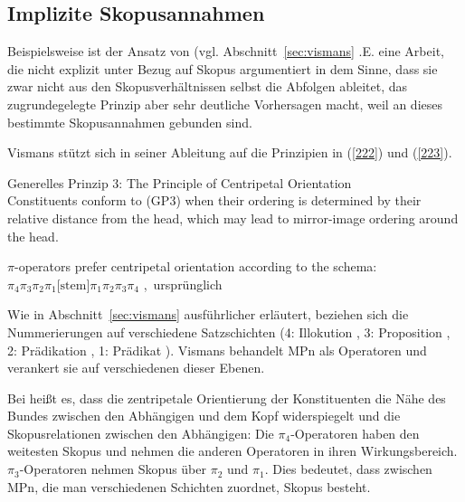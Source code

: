 \subsection{Implizite Skopusannahmen}
\label{sec:skopusimp}
Beispielsweise ist der Ansatz von \citet{Vismans1994} (vgl. Abschnitt~\ref{sec:vismans} .E. eine Arbeit, die nicht explizit unter Bezug auf Skopus argumentiert in dem Sinne, dass sie zwar nicht aus den Skopusverhältnissen selbst die Abfolgen ableitet, das zugrundegelegte Prinzip aber sehr deutliche Vorhersagen macht, weil an dieses bestimmte Skopusannahmen  gebunden sind.

Vismans stützt sich in seiner Ableitung auf die Prinzipien in (\ref{222}) und (\ref{223}).

\begin{exe}
	\ex\label{222} 
		Generelles Prinzip 3: The Principle of Centripetal Orientation \\
		Constituents conform to (GP3) when their ordering is determined by their relative distance from the head, which may lead to  mirror-image  					ordering around the head.
		\hfill\hbox {\citet[401]{Dik1997}}
\end{exe}

\begin{exe}
	\ex\label{223} 
	$\pi$-operators prefer centripetal orientation according to the schema:\\
 	$\pi_{\textrm{4}}\pi_{\textrm{3}}\pi_{\textrm{2}}\pi_{\textrm{1}}\textrm{[stem]}\pi_{\textrm{1}}\pi_{\textrm{2}}\pi_{\textrm{3}}\pi_{\textrm{4}}$ 
 	\newline
 	\hbox{}\hfill\hbox{\citet[414]{Dik1997}, ursprünglich \citet[141]{Hengeveld1989}}
\end{exe}
Wie in Abschnitt~\ref{sec:vismans} ausführlicher erläutert, beziehen sich die Nummerierungen auf verschiedene Satzschichten  (4: Illokution , 3: Proposition , 2: Prädikation , 1: Prädikat ). Vismans behandelt MPn als Operatoren  und verankert sie auf verschiedenen dieser Ebenen.

Bei \citet[402]{Dik1997} heißt es, dass die zentripetale Orientierung der Konstituen\-ten die Nähe des Bundes zwischen den Abhängigen und dem Kopf widerspiegelt und die Skopusrelationen zwischen den Abhängigen: Die $\pi_{\textrm{4}}$-Operatoren haben den weitesten Skopus und nehmen die anderen Operatoren in ihren Wirkungsbereich. $\pi_{\textrm{3}}$-Operatoren nehmen Skopus über $\pi_{\textrm{2}}$ und $\pi_{\textrm{1}}$. Dies bedeutet, dass zwi\-schen MPn, die man verschiedenen Schichten zuordnet, Skopus besteht.

